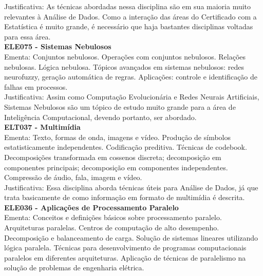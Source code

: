 \documentclass{article}
\begin{document}
	Justificativa: As técnicas abordadas nessa disciplina são em sua maioria muito relevantes à Análise de Dados. Como a interação das áreas do Certificado com a Estatística é muito grande, é necessário que haja bastantes disciplinas voltadas para essa área. \\
	\textbf{ELE075 - Sistemas Nebulosos} \\
	Ementa: Conjuntos nebulosos. Operações com conjuntos nebulosos. Relações nebulosas. Lógica nebulosa. Tópicos avançados em sistemas nebulosos: redes neurofuzzy, geração automática de regras. Aplicações: controle e identificação de falhas em processos. \\
	Justificativa: Assim como Computação Evolucionária e Redes Neurais Artificiais, Sistemas Nebulosos são um tópico de estudo muito grande para a área de Inteligência Computacional, devendo portanto, ser abordado. \\
	\textbf{ELT037 - Multimídia} \\
	Ementa: Texto, formas de onda, imagens e vídeo. Produção de símbolos estatisticamente independentes. Codificação preditiva. Técnicas de codebook. Decomposições transformada em cossenos discreta; decomposição em componentes principais; decomposição em componentes independentes. Compressão de áudio, fala, imagem e vídeo. \\
	Justificativa: Essa disciplina aborda técnicas úteis para Análise de Dados, já que trata basicamente de como informação em formato de multimídia é descrita. \\
	\textbf{ELE036 - Aplicações de Processamento Paralelo} \\
	Ementa: Conceitos e definições básicos sobre processamento paralelo. Arquiteturas paralelas. Centros de computação de alto desempenho. Decomposição e balanceamento de carga. Solução de sistemas lineares utilizando lógica paralela. Técnicas para desenvolvimento de programas computacionais paralelos em diferentes arquiteturas. Aplicação de técnicas de paralelismo na solução de problemas de engenharia elétrica. \\
\end{document}
